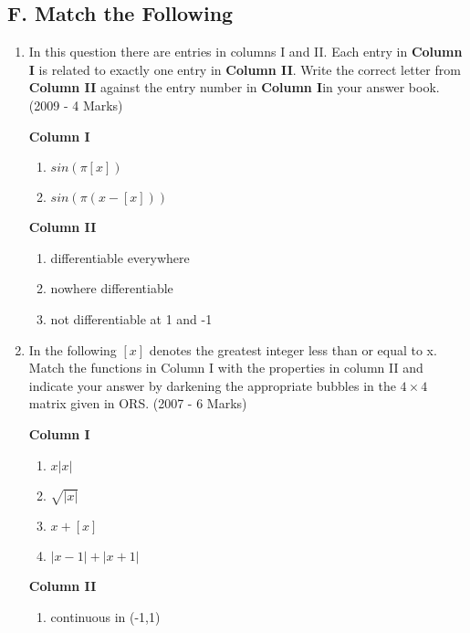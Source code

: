 \documentclass[journal,12pt,twocolumn]{IEEEtran}
\theoremstyle{remark}
\begin{document}
\subsection*{\textbf{F.  Match the Following}}
	\begin{enumerate}
		 \item[ 2. ] In this question there are entries in columns I and II. Each entry in \textbf{Column I} is related to exactly one entry in \textbf{Column II}. Write the correct letter from \textbf{Column II} against the entry number in \textbf{Column I}in your answer book.      \hfill(2009 - 4 Marks)
			\begin{multicols}{2}
                 \textbf{Column I}
				\begin{enumerate}[label=(\Alph*)]
				\item	$sin(\pi[x])$
				\item $sin(\pi(x-[x]))$
				\end{enumerate}
			\columnbreak
                 \textbf{Column II}
				\begin{enumerate}[label=(\alph*), start=16]
					\item  differentiable everywhere 
						
					\item  nowhere differentiable

					\item  not differentiable at 1 and -1  
						
				\end{enumerate}
				\end{multicols}
			\item[ 3. ] In the following $[x]$ denotes the greatest integer less than or equal to x. Match the functions in Column I with the properties in column II and indicate your answer by darkening the appropriate bubbles in the $4\times4$ matrix given in ORS.
                  \hfill(2007 - 6 Marks)
			\begin{multicols}{2}
				\textbf{Column I}

				\begin{enumerate}[label=(\Alph*)]
					\item  $x|x|$ 
					\item  $\sqrt{|x|}$ 
					\item $x+[x]$ 
					\item  $|x-1|+|x+1|$
				\end{enumerate}
			\columnbreak
				\textbf{Column II}
				\begin{enumerate}[label=(\alph*), start=16]
					\item  continuous in (-1,1)


\end{enumerate}
\end{multicols}
\end{enumerate}
\end{document}
